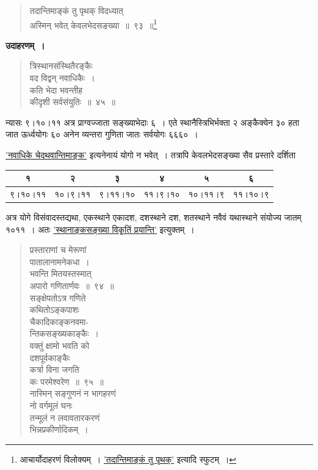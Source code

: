 \documentclass[11pt, openany]{book}
\begin{document}
\newpage

 \label{13.93}
\begin{quote}
{\gk तदान्तिमाङ्कं तु पृथक् विदध्यात् \\
अस्मिन् भवेत् केवलभेदसङ्ख्या~॥~९३~॥}\renewcommand{\thefootnote}{}\footnote{आचार्योदाहरणं विलोक्यम्~। \hyperref[13.93]{'तदान्तिमाङ्कं तु पृथक्'} इत्यादि स्फुटम्~।}
\end{quote}

\textbf{उदाहरणम्~।} 

\begin{quote}
{\ex त्रिस्थानसंस्थितैरङ्कैः\\
वद विद्वन् नवाधिकैः~। \\
कति भेदा भवन्तीह \\
कीदृशी सर्वसंयुतिः~॥~४५~॥~	}
\end{quote}

न्यासः ९।१०।११ अत्र प्राग्वज्जाता सङ्ख्याभेदाः ६~। एते स्थानैस्त्रिभिर्भक्ता २ अङ्कैक्येन ३० हता जात ऊर्ध्वयोगः ६० अनेन व्यन्तरा गुणिता जातः सर्वयोगः ६६६०~।
\vspace{3mm}

\hyperref[13.93.1]{'नवाधिके चेदथवान्तिमाङ्क'} इत्यनेनायं योगो न भवेत्~। तत्रापि केवलभेदसङ्ख्या सैव प्रस्तारे दर्शिता\textemdash \\

\hspace{1mm} \begin{tabular}{|c|c|c|c|c|c|}
	\hline
१ & २ & ३ & ४ & ५ & ६ \\
\hline
९।१०।११ & १०।९।११ & ९।११।१० & ११।९।१० & १०।११।९ & ११।१०।९\\
\hline 
\end{tabular}

\newpage

अत्र योगे विसंवादस्तद्यथा, एकस्थाने एकादश, दशस्थाने दश, शतस्थाने नवैवं यथास्थाने संयोज्य जातम् १०११~। अतः \hyperref[13.93.1]{'स्थानाङ्कसङ्ख्या विकृतिं प्रयान्ति'} इत्युक्तम्~।

\begin{quote}
{\gk प्रस्ताराणां च मेरूणां\\
पातालानामनेकधा~।\\
भवन्ति मितयस्तस्मात्\\
अपारो गणितार्णवः~॥~९४~॥\\
सङ्क्षेपतोऽत्र गणिते\\
कथितोऽङ्कपाशः\\
चैकादिकाङ्कनवमा-\\
न्तिकसङ्ख्यकाङ्कैः~।\\
वक्तुं क्षामो भवति को\\
दशपूर्वकाङ्कैः\\
कर्त्रा विना जगति\\
कः परमेश्वरेण~॥~९५~॥\\
नास्मिन् सङ्गुणनं न भागहरणं\\
नो वर्गमूलं घनः\\
तन्मूलं न लवावतारकरणं\\
भिन्नप्रकीर्णादिकम्~।}
\end{quote}
\end{document}
